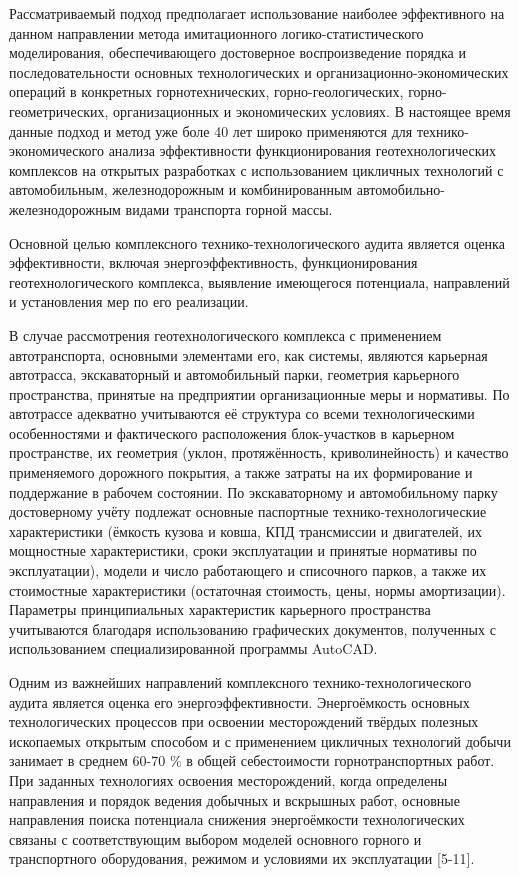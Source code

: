 Рассматриваемый подход предполагает использование наиболее эффективного
на данном направлении метода имитационного логико-статистического
моделирования, обеспечивающего достоверное воспроизведение порядка и
последовательности основных технологических и
организационно-экономических операций в конкретных горнотехнических,
горно-геологических, горно-геометрических, организационных и
экономических условиях. В настоящее время данные подход и метод уже боле
40 лет широко применяются для технико-экономического анализа
эффективности функционирования геотехнологических комплексов на открытых
разработках с использованием цикличных технологий с автомобильным,
железнодорожным и комбинированным автомобильно-железнодорожным видами
транспорта горной массы.

Основной целью комплексного технико-технологического аудита является
оценка эффективности, включая энергоэффективность, функционирования
геотехнологического комплекса, выявление имеющегося потенциала,
направлений и установления мер по его реализации.

В случае рассмотрения геотехнологического комплекса с применением
автотранспорта, основными элементами его, как системы, являются
карьерная автотрасса, экскаваторный и автомобильный парки, геометрия
карьерного пространства, принятые на предприятии организационные меры и
нормативы. По автотрассе адекватно учитываются её структура со всеми
технологическими особенностями и фактического расположения блок-участков
в карьерном пространстве, их геометрия (уклон, протяжённость,
криволинейность) и качество применяемого дорожного покрытия, а также
затраты на их формирование и поддержание в рабочем состоянии. По
экскаваторному и автомобильному парку достоверному учёту подлежат
основные паспортные технико-технологические характеристики (ёмкость
кузова и ковша, КПД трансмиссии и двигателей, их мощностные
характеристики, сроки эксплуатации и принятые нормативы по
эксплуатации), модели и число работающего и списочного парков, а также
их стоимостные характеристики (остаточная стоимость, цены, нормы
амортизации). Параметры принципиальных характеристик карьерного
пространства учитываются благодаря использованию графических документов,
полученных с использованием специализированной программы AutoCAD.

Одним из важнейших направлений комплексного технико-технологического
аудита является оценка его энергоэффективности. Энергоёмкость основных
технологических процессов при освоении месторождений твёрдых полезных
ископаемых открытым способом и с применением цикличных технологий добычи
занимает в среднем 60-70 \% в общей себестоимости горнотранспортных
работ. При заданных технологиях освоения месторождений, когда определены
направления и порядок ведения добычных и вскрышных работ, основные
направления поиска потенциала снижения энергоёмкости технологических
связаны с соответствующим выбором моделей основного горного и
транспортного оборудования, режимом и условиями их эксплуатации
{[}5-11{]}.

